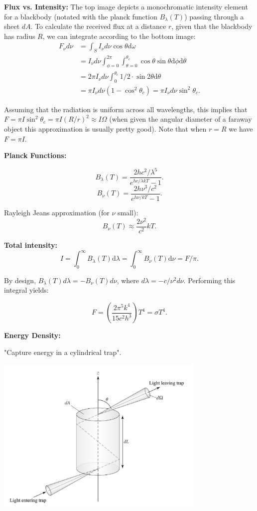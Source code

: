 \documentclass[12pt]{article}
\newcommand{\V}{

\vspace{\baselineskip}

}
\begin{document}
\textbf{Flux vs. Intensity:}\newline
The top image depicts a monochromatic intensity element for a blackbody (notated with the planck function $B_{\lambda}(T)$) passing through a sheet $dA$. To calculate the received flux at a distance $r$, given that the blackbody has radius $R$, we can integrate according to the bottom image:
\begin{align*}
F_{\nu}d\nu &= \int_S I_{\nu}d\nu\cos{\theta}d\omega \\
&= I_{\nu}d\nu \int_{\phi = 0}^{2\pi}\int_{\theta = 0}^{\theta_c}\cos{\theta}\sin{\theta}\mathrm{d}\phi \mathrm{d}\theta \\
&= 2\pi I_{\nu}d\nu\int_{0}^{\theta_c}1/2\cdot \sin{2\theta}\mathrm{d}\theta \\
&= \pi I_{\nu}d\nu (1-\cos^2{\theta_c}) = \pi I_{\nu}d\nu \sin^2{\theta_c}.
\end{align*}

Assuming that the radiation is uniform across all wavelengths, this implies that $F = \pi I \sin^2\theta_c = \pi I (R/r)^2 \approx I\Omega$ (when given the angular diameter of a faraway object this approximation is usually pretty good). Note that when $r=R$ we have $F = \pi I$.\V

\textbf{Planck Functions:}

\[B_{\lambda}(T) = \frac{2hc^2/\lambda^5}{e^{hc/\lambda kT} - 1}.\]
\[B_{\nu}(T) = \frac{2h\nu^3/c^2}{e^{h\nu/kT} - 1}.\]

Rayleigh Jeans approximation (for $\nu$ small):
\[B_{\nu}(T) \approx \frac{2\nu^2}{c^2}kT.\]

\textbf{Total intensity:}
\[I = \int_0^{\infty} B_{\lambda}(T)\mathrm{d}\lambda =  \int_0^{\infty} B_{\nu}(T)\mathrm{d}\nu = F/\pi.\]

By design, $B_{\lambda}(T)d\lambda = -B_{\nu}(T)d\nu$, where $d\lambda = -c/\nu^2 d\nu$. Performing this integral yields:

\[F = \left(\frac{2\pi^5 k^4}{15c^2 h^3}\right)T^4 = \sigma T^4.\]

\textbf{Energy Density:}

"Capture energy in a cylindrical trap". 

\begin{center}
    \includegraphics[width=10cm]{images/energydensity.png}
\end{center}
\end{document}
